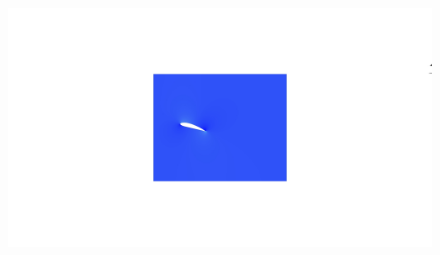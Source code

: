 \documentclass[english,10pt,a4paper,twoside]{beamer}
\begin{document}
	\begin{frame}
		\begin{figure}[H]
			\centering
			\href{https://youtu.be/w_SOb47J_YI}{
			\includegraphics[width=\textheight]{animation-1_1_0000}
			\label{fig:animation-110000}}
		\end{figure}
		
	\end{frame}
	
	
	
	
\end{document}
